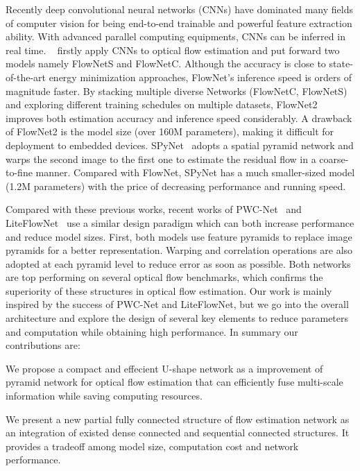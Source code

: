 \documentclass{article}
\begin{document}
Recently deep convolutional neural networks (CNNs) have dominated many fields of computer vision for being end-to-end trainable and powerful feature extraction ability. With advanced parallel computing equipments, CNNs can be inferred in real time. ~\cite{Fischer2015FlowNetLO} firstly apply CNNs to optical flow estimation and put forward two models namely FlowNetS and FlowNetC. Although the accuracy is close to  state-of-the-art energy minimization approaches, FlowNet's inference speed is orders of magnitude faster. By stacking multiple diverse Networks (FlowNetC, FlowNetS) and exploring different training schedules on multiple datasets, FlowNet2~\cite{Ilg2017FlowNet2E} improves both estimation accuracy and inference speed considerably. A drawback of FlowNet2 is
the model size (over 160M parameters), making it difficult for deployment to embedded devices. SPyNet~\cite{Ranjan2017OpticalFE} adopts a spatial pyramid network and warps the second image to the first one to estimate the residual flow in a coarse-to-fine manner. Compared with FlowNet, SPyNet has a much smaller-sized model (1.2M parameters) with the price of decreasing performance and running speed.

Compared with these previous works, recent works of
PWC-Net~\cite{Sun_2018_CVPR} and LiteFlowNet~\cite{Hui_2018_CVPR} use a similar design paradigm which can both increase performance and reduce model sizes. First, both models use feature pyramids to replace image pyramids for a better representation. Warping and correlation operations are also adopted at each pyramid level to reduce error as soon as possible. Both networks are top performing on several optical flow benchmarks, which confirms the superiority of these structures in optical flow estimation. Our work is mainly inspired by the success of PWC-Net and LiteFlowNet, but we go into
the overall architecture and explore the design of several key elements to reduce parameters and computation while obtaining high performance. In summary our contributions are:

 We propose a compact and effecient U-shape network as a improvement of pyramid network for optical flow estimation that can efficiently fuse multi-scale information while saving computing resources.

 We present a new partial fully connected structure of flow estimation network as an integration of existed dense connected and sequential connected structures. It provides a tradeoff among model size, computation cost and network performance.
\end{document}

